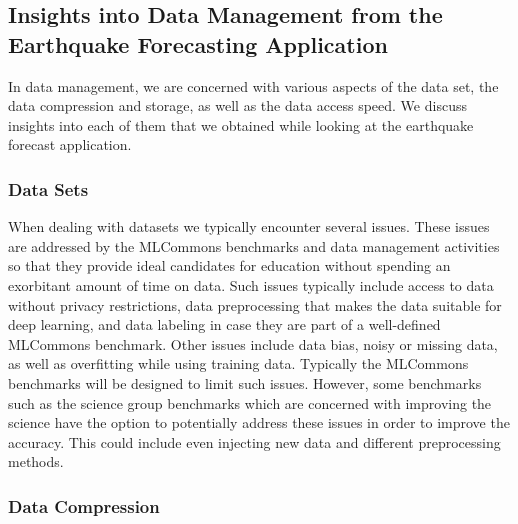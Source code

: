 \documentclass[utf8]{FrontiersinVancouver} %
\begin{document}


\subsection{Insights into Data Management from the Earthquake Forecasting Application}
\label{sec:eq-data}

In data management, we are concerned with various aspects of the data set, the data compression and storage, as well as the data access speed. We discuss insights into each of them that we obtained while looking at the earthquake forecast application.

\subsubsection{Data Sets}

When dealing with datasets we typically encounter several issues.  These issues are addressed by the MLCommons benchmarks and data management activities so that they provide ideal candidates for education without spending an exorbitant amount of time on data. Such issues typically include access to data without privacy restrictions, data preprocessing that makes the data suitable for deep learning, and data labeling in case they are part of a well-defined MLCommons benchmark. Other issues include data bias, noisy or missing data, as well as overfitting while using training data. Typically the MLCommons benchmarks will be designed to limit such issues. However, some benchmarks such as the science group benchmarks which are concerned with improving the science have the option to potentially address these issues in order to improve the accuracy. This could include even injecting new data and different preprocessing methods.


\subsubsection{Data Compression}
\end{document}
